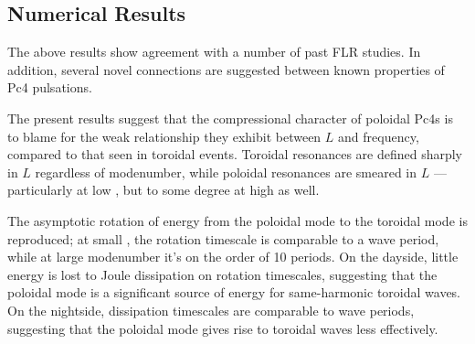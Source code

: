 \documentclass[jgrga]{agutex}
\begin{document}
\begin{article}
\section{Numerical Results}






The above results show agreement with a number of past FLR studies. In
addition, several novel connections are suggested between known
properties of Pc4 pulsations. 

The present results suggest that the compressional character of poloidal
Pc4s is to blame for the weak relationship they exhibit between $L$ and
frequency, compared to that seen in toroidal events. Toroidal resonances
are defined sharply in $L$ regardless of modenumber, while poloidal
resonances are smeared in $L$ --- particularly at low \azm, but to some
degree at high \azm as well. 

The asymptotic rotation of energy from the poloidal mode to the toroidal
mode is reproduced; at small \azm, the rotation timescale is comparable
to a wave period, while at large modenumber it's on the order of 10
periods. On the dayside, little energy is lost to Joule dissipation on
rotation timescales, suggesting that the poloidal mode is a significant
source of energy for same-harmonic toroidal waves. On the nightside,
dissipation timescales are comparable to wave periods, suggesting that
the poloidal mode gives rise to toroidal waves less effectively. 


\end{article}
\end{document}
